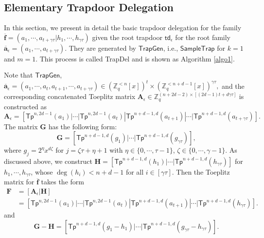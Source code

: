 \documentclass[runningheads]{llncs}
\begin{document}
    \fi
    
\subsection{Elementary Trapdoor Delegation }\label{basictrap}
In this section, we present in detail the basic trapdoor delegation
for the family $\overline{\mathbf{f}}=(a_1, \cdots, a_{t+\gamma \tau} | h_1, \cdots,h_{\gamma \tau})$ 
given the root trapdoor $\textsf{td}_{\epsilon}$ for the root family $\overline{\mathbf{a}}_{\epsilon}=(a_1, \cdots, a_{t+\gamma \tau})$.
They are generated by $\mathsf{TrapGen}$, i.e.,  $\mathsf{SampleTrap}$ for $k=1$ and $m=1$.
This process is called  \textsf{TrapDel} and is shown as Algorithm \ref{algo1}.
  
Note that $\textsf{TrapGen}$,    	
$\overline{\mathbf{a}}_{\epsilon}=(a_1,\cdots,a_t,a_{t+1},\cdots,a_{t+\gamma \tau}) \in (\mathbb{Z}_q^{<n}[x])^t \times (\mathbb{Z}_q^{<n+d-1}[x])^{\gamma \tau},$ 
and the corresponding concatenated Toeplitz matrix $\mathbf{A}_{\epsilon} \in \mathbb{Z}_q^{(n+2d-2)\times [(2d-1)t+d\gamma \tau]}$ is constructed as 
  	\begin{equation}\label{k10}
  \mathbf{A}_{\epsilon}=[\mathsf{Tp}^{n,2d-1}(a_1)|\cdots|\mathsf{Tp}^{n,2d-1}(a_t)| \mathsf{Tp}^{n+d-1,d}(a_{t+1})|\cdots|\mathsf{Tp}^{n+d-1,d}(a_{t+\gamma \tau})].
  \end{equation} 
The matrix $\textbf{G}$ has the following form:
 $$\mathbf{G}=[ \mathsf{Tp}^{n+d-1,d}(g_1) | \cdots | \mathsf{Tp}^{n+d-1,d}(g_{\gamma \tau})],$$ 
  where $g_j=2^\eta x^{d\zeta}$ for $j=\zeta \tau+\eta+1$ with $\eta \in \{0,\cdots, \tau-1\}$, $\zeta \in \{0,\cdots, \gamma-1 \}$.
As discussed above, we construct   
    $\mathbf{H}=[ \mathsf{Tp}^{n+d-1,d}(h_1) | \cdots | \mathsf{Tp}^{n+d-1,d}(h_{\gamma \tau})]$ for $h_1, \cdots, h_{\gamma \tau}$, whose $\deg(h_i)<n+d-1$ for all $i\in [\gamma \tau]$. 
Then the Toeplitz matrix for $\overline{\mathbf{f}}$ takes the form 
    	\begin{equation}\label{k30}
     \begin{split}
      \mathbf{F}&=[\mathbf{A}_{\epsilon}|\mathbf{H}]\\&=[\mathsf{Tp}^{n,2d-1}(a_1)|\cdots|\mathsf{Tp}^{n,2d-1}(a_t)| \mathsf{Tp}^{n+d-1,d}(a_{t+1})|\cdots|\mathsf{Tp}^{n+d-1,d}(h_{\gamma \tau})].
     \end{split}
      \end{equation} 
 and 
    \begin{equation}\label{k11}
    \mathbf{G}-\mathbf{H}=[ \mathsf{Tp}^{n+d-1,d}(g_1-h_1) | \cdots | \mathsf{Tp}^{n+d-1,d}(g_{\gamma \tau}-h_{\gamma \tau})].
        \end{equation}
\end{document}
